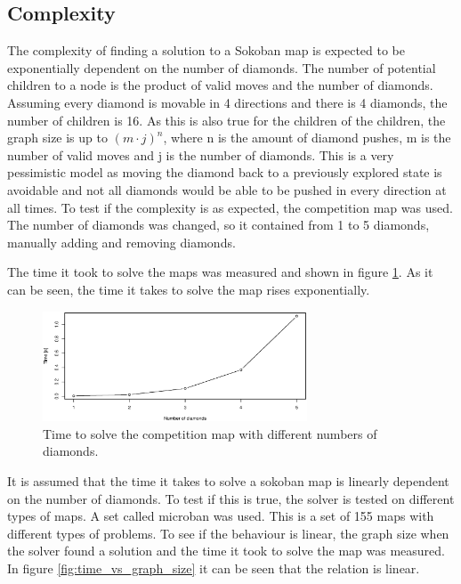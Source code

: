 \subsection{Complexity}
The complexity of finding a solution to a Sokoban map is expected to be exponentially dependent on the number of diamonds.
The number of potential children to a node is the product of valid moves and the number of diamonds.
Assuming every diamond is movable in 4 directions and there is 4 diamonds, the number of children is 16.
As this is also true for the children of the children, the graph size is up to $(m\cdot j)^n$, where n is the amount of diamond pushes, m is the number of valid moves and j is the number of diamonds.
This is a very pessimistic model as moving the diamond back to a previously explored state is avoidable and not all diamonds would be able to be pushed in every direction at all times.
To test if the complexity is as expected, the competition map was used.
The number of diamonds was changed, so it contained from 1 to 5 diamonds, manually adding and removing diamonds.

The time it took to solve the maps was measured and shown in figure \ref{fig:complexity_of_sokoban}.
As it can be seen, the time it takes to solve the map rises exponentially.

\begin{figure}[h]
\centering
 \includegraphics[width=0.7\textwidth]{img/sokoban_complexity_time}
 \caption{Time to solve the competition map with different numbers of diamonds.}
 \label{fig:complexity_of_sokoban}
\end{figure}


It is assumed that the time it takes to solve a sokoban map is linearly dependent on the number of diamonds.
To test if this is true, the solver is tested on different types of maps.
A set called microban \cite{url:microban} was used.
This is a set of 155 maps with different types of problems.
To see if the behaviour is linear, the graph size when the solver found a solution and the time it took to solve the map was measured.
In figure \ref{fig:time_vs_graph_size} it can be seen that the relation is linear.

